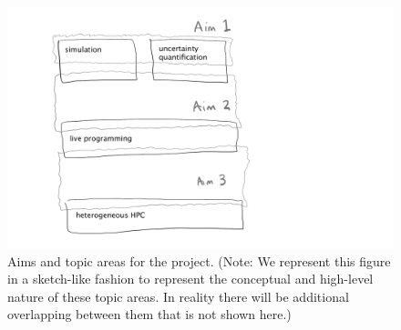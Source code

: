 \begin{figure}
  \begin{center}
    \includegraphics[scale=0.17]{figures/aims-figure.png}%
    \caption{Aims and topic areas for the project. (Note: We represent this figure in a sketch-like fashion to represent the conceptual and high-level nature of these topic areas. In reality there will be additional overlapping between them that is not shown here.)}\label{projectFig}
  \end{center}
\end{figure}

